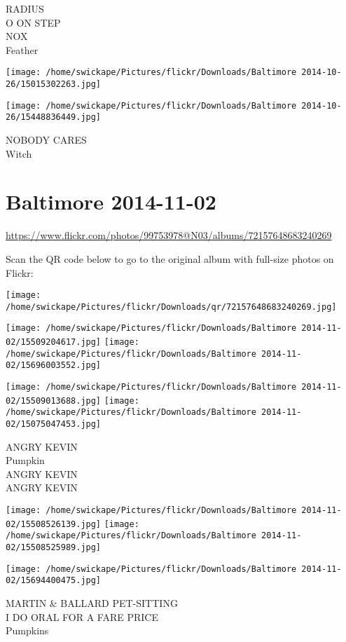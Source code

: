 \documentclass[10pt,letterpaper]{article}
\begin{document}
RADIUS\\
O ON STEP\\
NOX\\
Feather
\pagebreak

\texttt{[image: /home/swickape/Pictures/flickr/Downloads/Baltimore 2014-10-26/15015302263.jpg]}

\vspace{0.25in}
\texttt{[image: /home/swickape/Pictures/flickr/Downloads/Baltimore 2014-10-26/15448836449.jpg]}

NOBODY CARES\\
Witch
\pagebreak

\section*{Baltimore 2014-11-02}

\url{https://www.flickr.com/photos/99753978@N03/albums/72157648683240269}

Scan the QR code below to go to the original album with full-size photos on Flickr:

\texttt{[image: /home/swickape/Pictures/flickr/Downloads/qr/72157648683240269.jpg]}
\pagebreak

\texttt{[image: /home/swickape/Pictures/flickr/Downloads/Baltimore 2014-11-02/15509204617.jpg]}
\texttt{[image: /home/swickape/Pictures/flickr/Downloads/Baltimore 2014-11-02/15696003552.jpg]}

\texttt{[image: /home/swickape/Pictures/flickr/Downloads/Baltimore 2014-11-02/15509013688.jpg]}
\texttt{[image: /home/swickape/Pictures/flickr/Downloads/Baltimore 2014-11-02/15075047453.jpg]}

ANGRY KEVIN\\
Pumpkin\\
ANGRY KEVIN\\
ANGRY KEVIN
\pagebreak

\texttt{[image: /home/swickape/Pictures/flickr/Downloads/Baltimore 2014-11-02/15508526139.jpg]}
\texttt{[image: /home/swickape/Pictures/flickr/Downloads/Baltimore 2014-11-02/15508525989.jpg]}

\vspace{0.25in}
\texttt{[image: /home/swickape/Pictures/flickr/Downloads/Baltimore 2014-11-02/15694400475.jpg]}

MARTIN \& BALLARD PET{-}SITTING\\
I DO ORAL FOR A FARE PRICE\\
Pumpkins
\pagebreak
\end{document}
